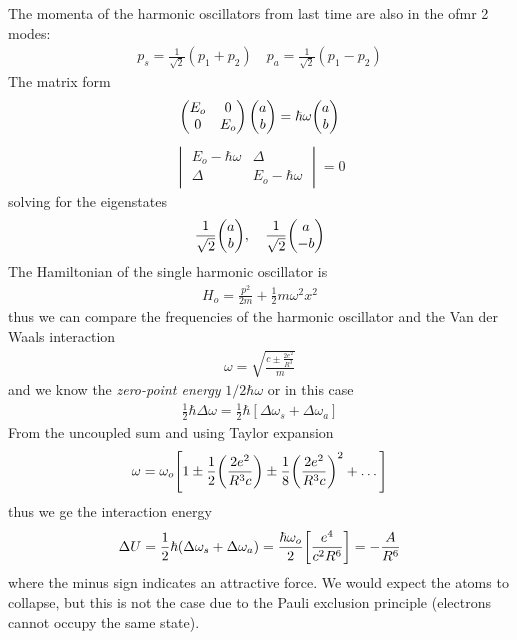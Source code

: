 \documentclass[../main.tex]{subfiles}
\begin{document}
The momenta of the harmonic oscillators from last time are also in the ofmr 2 modes:
\begin{align*}
    p_s = \frac{1}{\sqrt{2}}(p_1 + p_2) \quad p_a = \frac{1}{\sqrt{2}}(p_1 - p_2)
\end{align*}
The matrix form
\begin{align*}
    \begin{pmatrix}
        E_o & 0 \\
        0 & E_o
    \end{pmatrix} \mqty(a \\ b)
    = \hbar \omega \mqty(a \\ b)
\end{align*}
\begin{align*}
    \begin{vmatrix}
        E_o - \hbar \omega & \Delta \\
        \Delta & E_o - \hbar \omega
    \end{vmatrix}
    = 0
\end{align*}
solving for the eigenstates
\begin{align*}
    \frac{1}{\sqrt{2}} \mqty(a \\ b), \quad \frac{1}{\sqrt{2}} \mqty(a \\ -b)
\end{align*}
The Hamiltonian of the single harmonic oscillator is
\begin{align*}
    H_o = \frac{p^2}{2m} + \frac{1}{2} m \omega^2 x^2
\end{align*}
thus we can compare the frequencies of the harmonic oscillator and the Van der Waals interaction
\begin{align*}
    \omega = \sqrt{\frac{c \pm \frac{2e^2}{R^3}}{m}}
\end{align*}
and we know the \emph{zero-point energy} $1/2 \hbar \omega$ or in this case 
\begin{align*}
    \frac{1}{2} \hbar \Delta \omega = \frac{1}{2} \hbar [\Delta \omega_s + \Delta \omega_a]
\end{align*}
From the uncoupled sum and using Taylor expansion
\begin{align*}
    \omega = \omega_o \qt[1 \pm \frac{1}{2} \qt(\frac{2e^2}{R^3c})
    \pm \frac{1}{8} \qt(\frac{2e^2}{R^3c})^2 + \dots]
\end{align*}
thus we ge the interaction energy
\begin{align*}
    \Delta U = \frac{1}{2} \hbar (\Delta \omega_s + \Delta \omega_a)
    = \frac{\hbar\omega_o}{2} \qt[\frac{e^4}{c^2 R^6}] = -\frac{A}{R^6}
\end{align*}
where the minus sign indicates an attractive force. We would expect the atoms to collapse, but
this is not the case due to the Pauli exclusion principle (electrons cannot occupy the same state).
\end{document}
